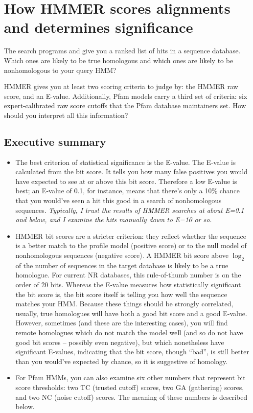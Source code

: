\section{How HMMER scores alignments and determines significance}

The search programs  and  give you a
ranked list of hits in a sequence database.  Which ones are likely to
be true homologous and which ones are likely to be nonhomologous to
your query HMM?

HMMER gives you at least two scoring criteria to judge by: the HMMER
raw score, and an E-value. Additionally, Pfam models carry a third set
of criteria: six expert-calibrated raw score cutoffs that the Pfam
database maintainers set. How should you interpret all this
information?

\subsection{Executive summary}

\begin{itemize}
\item The best criterion of statistical significance is the E-value.
The E-value is calculated from the bit score. It tells you how many
false positives you would have expected to see at or above this bit
score. Therefore a low E-value is best; an E-value of 0.1, for
instance, means that there's only a 10\% chance that you would've seen
a hit this good in a search of nonhomologous sequences. {\em
Typically, I trust the results of HMMER searches at about E=0.1 and
below, and I examine the hits manually down to E=10 or so.}

\item HMMER bit scores are a stricter criterion: they reflect whether
the sequence is a better match to the profile model (positive score)
or to the null model of nonhomologous sequences (negative score).  A
HMMER bit score above $\log_2$ of the number of sequences in the
target database is likely to be a true homologue. For current NR
databases, this rule-of-thumb number is on the order of 20 bits.
Whereas the E-value measures how statistically significant the bit
score is, the bit score itself is telling you how well the sequence
matches your HMM. Because these things should be strongly correlated,
usually, true homologues will have both a good bit score and a good
E-value. However, sometimes (and these are the interesting cases), you
will find remote homologues which do not match the model well (and so
do not have good bit scores -- possibly even negative), but which
nonetheless have significant E-values, indicating that the bit score,
though ``bad'', is still better than you would've expected by chance,
so it is suggestive of homology.

\item For Pfam HMMs, you can also examine six other numbers that
represent bit score thresholds: two TC (trusted cutoff) scores, two GA
(gathering) scores, and two NC (noise cutoff) scores. The meaning of
these numbers is described below.
\end{itemize}

